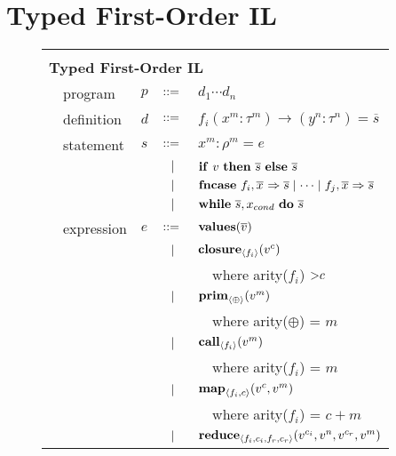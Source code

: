 \documentclass[preprint]{sigplanconf}
\begin{document}
\section{Typed First-Order IL}
\begin{figure}[h!]
  \begin{tabular}{| m{0.01cm}m{1.3cm}m{0.1cm}m{0.2cm}p{5.0cm} |}
  \hline
    & & & &\\
   \multicolumn{5}{|l|}{\textbf{Typed First-Order IL}}  \\[4pt]
  & program & $p$ &  $::=$   &  $d_1 \cdots d_n $ \\[4pt]
  & definition & $d$ & $::=$ & $f_i(x^m : \tau^m) \rightarrow (y^n : \tau^n) = \overline{s} $ \\[4pt]
  & statement  & $s$ & $::=$ & $x^m : \rho^m = e $\\[2pt]
  &            &     & $\ \ | \ \ $    & $\mbox{\textbf{if}} ~v~ \mbox{\textbf{then}} ~\overline{s}~ \mbox{\textbf{else}} ~ \overline{s}$ \\[2pt]
  &            &     & $\ \ | \ \ $    & $\textbf{fncase} ~ f_i, \overline{x} ~\small{\Rightarrow}~ \overline{s} ~ | ~\small{\cdots}~ | ~ f_j, \overline{x} ~\small{\Rightarrow}~ \overline{s}   $ \\[2pt]
  &            &     & $\ \ | \ \ $    & $\mbox{\textbf{while}} ~ \overline{s}, x_{cond} ~ \mbox{\textbf{do}} ~ \overline{s} ~  $ \\[4pt]
  & expression & $e$ & $::=$ & $\mbox{\textbf{values}}(\overline{v})$ \\[2pt]
  &            &     & $\ \ | \ \ $    & $\mbox{\textbf{closure}} _{\left\langle f_i \right\rangle} (v^c) $ \\[1.5pt]
  &            &     &           & ~~\small{where arity($f_i$) $ \small{>}  c$} \\[2pt]
  &            &     & $\ \ | \ \ $    & $\mbox{\textbf{prim}}_{\left\langle \oplus \right\rangle }(v^m)$ \\[1.5pt]
  &            &     &           & ~~\small{where arity($\oplus$) = $m$} \\[2pt]
  &            &     & $\ \ | \ \ $    & $\mbox{\textbf{call}} _{\left\langle f_i  \right\rangle } (v^m)$ \\[1.5pt] 
  &            &     &           & ~~\small{where arity($f_i$) = $m$} \\[2pt]
  &            &     & $\ \ | \ \ $    & $\mbox{\textbf{map}} _{\left\langle f_i, c \right\rangle}(v^c, v^m)$ \\[1.5pt]
  &            &     &           & ~~\small{where arity($f_i$) = $c+m$} \\[2pt]
  &            &     & $\ \ | \ \ $    & $\mbox{\textbf{reduce}} _{ \left\langle f_i, c_i, f_r, c_r \right\rangle } (v^{c_i}, v^n, v^{c_r}, v^{m})$ \\[1.5pt]

\end{tabular}
\end{figure}
\end{document}
